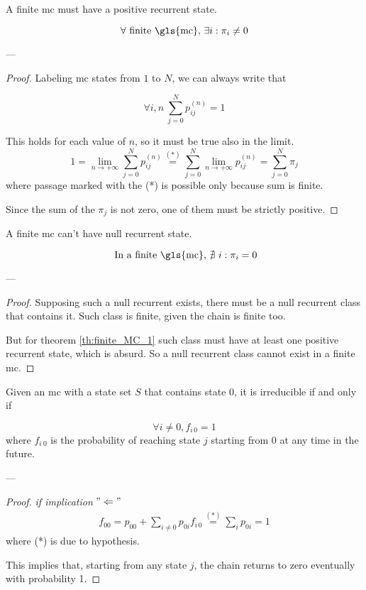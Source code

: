 	\begin{theorem} \label{th:finite_MC_1}
		A finite \gls{mc} must have a positive recurrent state.

		$$ \forall \text{ finite \gls{mc}, } \exists i: \pi_i \neq 0 $$
	\end{theorem}
	---
	\begin{proof}
		Labeling \gls{mc} states from $1$ to $N$, we can always write that

		$$ \forall i, n ~ \sum_{j=0}^N p_{ij}^{(n)} = 1$$

		This holds for each value of $n$, so it must be true also in the limit.
		$$ 1 = \lim_{n \to +\infty} \sum_{j=0}^N p_{ij}^{(n)} \stackrel{(*)}{=} \sum_{j=0}^N \lim_{n \to +\infty} p_{ij}^{(n)}
		= \sum_{j=0}^N \pi_j $$
		where passage marked with the (*) is possible only because sum is finite.

		Since the sum of the $\pi_j$ is not zero, one of them must be strictly positive.
	\end{proof}

	\begin{theorem}
		A finite \gls{mc} can't have null recurrent state.

		$$ \text{ In a finite \gls{mc}, } \nexists~ i: \pi_i = 0 $$
	\end{theorem}
	---
	\begin{proof}
		Supposing such a null recurrent exists, there must be a null recurrent class that contains it.
		Such class is finite, given the chain is finite too.

		But for theorem \ref{th:finite_MC_1} such class must have at least one positive recurrent state, which is absurd.
		So a null recurrent class cannot exist in a finite \gls{mc}.
	\end{proof}

	\begin{lemma}
		Given an \gls{mc} with a state set $S$ that contains state 0, it is irreducible if and only if

		$$ \forall i \neq 0, f_{i\,0} = 1 $$
		where $f_{i~0}$ is the probability of reaching state $j$ starting from 0 at any time in the future.
	\end{lemma}
	---
	\begin{proof} \emph{if implication} $"\Leftarrow"$
		\begin{equation}\begin{split}
			f_{00} = p_{00} + \sum_{i \neq 0} p_{0i} f_{i\,0} \stackrel{(*)}{=} \sum_{i} p_{0i} = 1
		\end{split}\end{equation}
		where (*) is due to hypothesis.

		This implies that, starting from any state $j$, the chain returns to zero eventually with probability 1.
	\end{proof}

